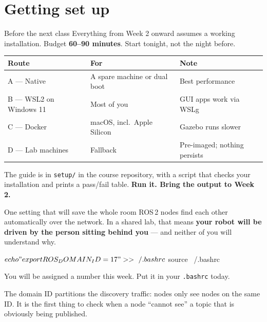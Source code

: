 \documentclass[aspectratio=169]{beamer}
\begin{document}
\section{Getting set up}

\begin{frame}{Before the next class}
  \small
  Everything from Week 2 onward assumes a working \rosver{} installation. Budget
  \textbf{60--90 minutes}. Start tonight, not the night before.

  \vspace{0.6em}
  \begin{center}
  \begin{tabular}{@{}llp{4.6cm}@{}}
    \toprule
    \textbf{Route} & \textbf{For} & \textbf{Note} \\
    \midrule
    A --- Native \ubuntuver{} & A spare machine or dual boot & Best performance \\
    B --- WSL2 on Windows 11  & Most of you & GUI apps work via WSLg \\
    C --- Docker              & macOS, incl.\ Apple Silicon & Gazebo runs slower \\
    D --- Lab machines        & Fallback & Pre-imaged; nothing persists \\
    \bottomrule
  \end{tabular}
  \end{center}

  \vspace{0.6em}
  The guide is in \texttt{setup/} in the course repository, with a script that checks your
  installation and prints a pass/fail table. \textbf{Run it. Bring the output to Week 2.}
\end{frame}

\begin{frame}[fragile]{One setting that will save the whole room}
  \small
  ROS\,2 nodes find each other automatically over the network. In a shared lab, that means
  \textbf{your robot will be driven by the person sitting behind you} --- and neither of you
  will understand why.

  \begin{shells}
$ echo "export ROS_DOMAIN_ID=17" >> ~/.bashrc
$ source ~/.bashrc
  \end{shells}

  \vspace{0.4em}
  You will be assigned a number this week. Put it in your \texttt{.bashrc} today.

  \vspace{0.5em}
  \begin{underhood}
    \footnotesize
    The domain ID partitions the discovery traffic: nodes only see nodes on the same ID.
    It is the first thing to check when a node ``cannot see'' a topic that is obviously
    being published.
  \end{underhood}
\end{frame}
\end{document}
